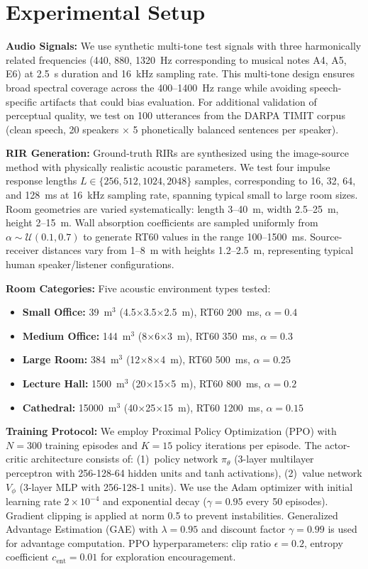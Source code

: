 \documentclass[10pt,conference]{IEEEtran}
\begin{document}
\section{Experimental Setup}

\textbf{Audio Signals:} We use synthetic multi-tone test signals with three harmonically related frequencies (440, 880, 1320~Hz corresponding to musical notes A4, A5, E6) at 2.5~s duration and 16~kHz sampling rate. This multi-tone design ensures broad spectral coverage across the 400--1400~Hz range while avoiding speech-specific artifacts that could bias evaluation. For additional validation of perceptual quality, we test on 100 utterances from the DARPA TIMIT corpus (clean speech, 20 speakers $\times$ 5 phonetically balanced sentences per speaker).

\textbf{RIR Generation:} Ground-truth RIRs are synthesized using the image-source method \cite{allen1979image} with physically realistic acoustic parameters. We test four impulse response lengths $L \in \{256, 512, 1024, 2048\}$ samples, corresponding to 16, 32, 64, and 128~ms at 16~kHz sampling rate, spanning typical small to large room sizes. Room geometries are varied systematically: length 3--40~m, width 2.5--25~m, height 2--15~m. Wall absorption coefficients are sampled uniformly from $\alpha \sim \mathcal{U}(0.1, 0.7)$ to generate RT60 values in the range 100--1500~ms. Source-receiver distances vary from 1--8~m with heights 1.2--2.5~m, representing typical human speaker/listener configurations.

\textbf{Room Categories:} Five acoustic environment types tested:
\begin{itemize}
\item \textbf{Small Office:} 39~m$^3$ (4.5$\times$3.5$\times$2.5~m), RT60 200~ms, $\alpha=0.4$
\item \textbf{Medium Office:} 144~m$^3$ (8$\times$6$\times$3~m), RT60 350~ms, $\alpha=0.3$
\item \textbf{Large Room:} 384~m$^3$ (12$\times$8$\times$4~m), RT60 500~ms, $\alpha=0.25$
\item \textbf{Lecture Hall:} 1500~m$^3$ (20$\times$15$\times$5~m), RT60 800~ms, $\alpha=0.2$
\item \textbf{Cathedral:} 15000~m$^3$ (40$\times$25$\times$15~m), RT60 1200~ms, $\alpha=0.15$
\end{itemize}

\textbf{Training Protocol:} We employ Proximal Policy Optimization (PPO) \cite{schulman2017proximal} with $N=300$ training episodes and $K=15$ policy iterations per episode. The actor-critic architecture consists of: (1)~policy network $\pi_\theta$ (3-layer multilayer perceptron with 256-128-64 hidden units and tanh activations), (2)~value network $V_\phi$ (3-layer MLP with 256-128-1 units). We use the Adam optimizer with initial learning rate $2\times10^{-4}$ and exponential decay ($\gamma=0.95$ every 50 episodes). Gradient clipping is applied at norm 0.5 to prevent instabilities. Generalized Advantage Estimation (GAE) with $\lambda=0.95$ and discount factor $\gamma=0.99$ is used for advantage computation. PPO hyperparameters: clip ratio $\epsilon=0.2$, entropy coefficient $c_\text{ent}=0.01$ for exploration encouragement.
\end{document}
